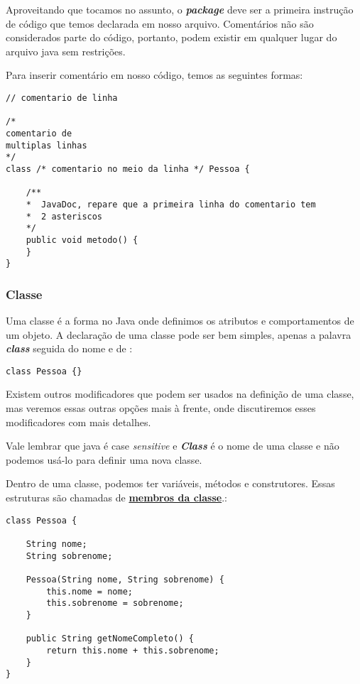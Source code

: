 \documentclass[12pt]{article}
\begin{document}
Aproveitando que tocamos no assunto, o \textbf{\textit{package}} deve ser a primeira instrução de código que temos declarada em nosso arquivo. Comentários não são considerados parte do código, portanto, podem existir em qualquer lugar do arquivo java sem restrições.

Para inserir comentário em nosso código, temos as seguintes formas:

\begin{lstlisting}
// comentario de linha

/*
comentario de
multiplas linhas
*/
class /* comentario no meio da linha */ Pessoa {
	
	/**
	*  JavaDoc, repare que a primeira linha do comentario tem
	*  2 asteriscos
	*/
	public void metodo() {
	}
}
\end{lstlisting}

\subsubsection{Classe}

Uma classe é a forma no Java onde definimos os atributos e comportamentos de um objeto. A declaração de uma classe pode ser bem simples, apenas a palavra \textbf{\textit{class}} seguida do nome e de \textbf{\textit{{}}}:

\begin{lstlisting}
class Pessoa {}
\end{lstlisting}

Existem outros modificadores que podem ser usados na definição de uma classe, mas veremos essas outras opções mais à frente, onde discutiremos esses modificadores com mais detalhes.

Vale lembrar que java é case \textit{sensitive} e \textbf{\textit{Class}} é o nome de uma classe e não podemos usá-lo para definir uma nova classe.

Dentro de uma classe, podemos ter variáveis, métodos e construtores. Essas estruturas são chamadas de \underline{\textbf{membros da classe}}.:

\begin{lstlisting}
class Pessoa {
	
	String nome;
	String sobrenome;
	
	Pessoa(String nome, String sobrenome) {
		this.nome = nome;
		this.sobrenome = sobrenome;
	}
	
	public String getNomeCompleto() {
		return this.nome + this.sobrenome;
	}
}	
\end{lstlisting}
\end{document}
